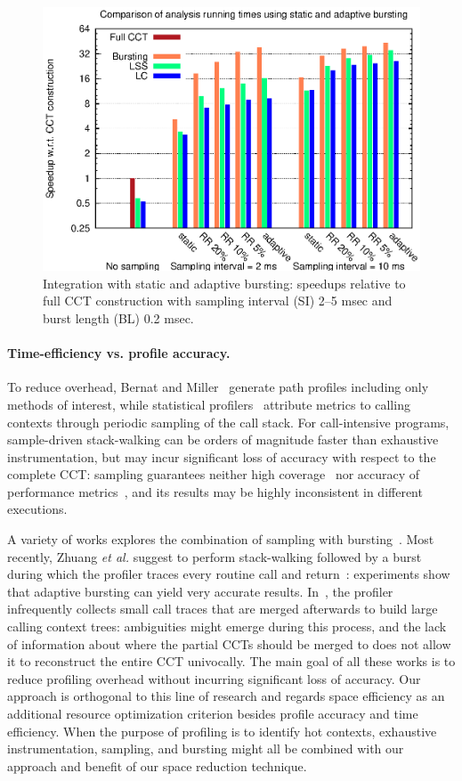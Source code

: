 \documentclass[preprint]{sigplanconf}
\begin{document}
\begin{figure}[t]
\center\includegraphics[width=6.8 cm]{charts/speedup.eps}
\caption{Integration with static and adaptive bursting: speedups relative to full CCT construction with sampling interval (SI) 2--5 msec and burst length (BL) 0.2 msec.}
\label{fig:speedup}
\end{figure} 

\vspace{-1mm}
\paragraph{Time-efficiency vs. profile accuracy.} To reduce overhead, Bernat and Miller~\cite{BM04} generate path profiles including only methods of interest, while statistical profilers~\cite{AS00, FMF05, HG93, W00} attribute metrics to calling contexts through periodic sampling of the call stack. For call-intensive programs, sample-driven stack-walking can be orders of magnitude faster than exhaustive instrumentation, but may incur significant loss of accuracy with respect to the complete CCT: sampling guarantees neither high coverage~\cite{BM07} nor accuracy of performance metrics~\cite{ZSCC06}, and its results may be highly inconsistent in different executions. 

A variety of works explores the combination of sampling with bursting~\cite{AR01, HC01, ZSCC06}. Most recently, Zhuang {\em et al.} suggest to perform stack-walking followed by a burst during which the profiler traces every routine call and return~\cite{ZSCC06}: experiments show that adaptive bursting can yield very accurate results. In~\cite{SZ09}, the profiler infrequently collects small call traces that are merged afterwards to build large calling context trees: ambiguities might emerge during this process, and the lack of information about where the partial CCTs should be merged to does not allow it to reconstruct the entire CCT univocally.
The main goal of all these works is to reduce profiling overhead without incurring significant loss of accuracy. 
Our approach is orthogonal to this line of research and regards space efficiency as an additional resource optimization criterion besides profile accuracy and time efficiency. When the purpose of profiling is to identify hot contexts, exhaustive instrumentation, sampling, and bursting might all be combined with our approach and benefit of our space reduction technique.
\end{document}
